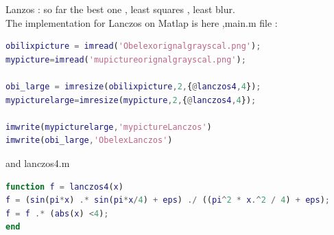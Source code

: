 \documentclass{article}
\begin{document}
Lanzos : so far the best one , least squares , least blur.\\
The implementation for Lanczos on Matlap is here ,main.m file :
\begin{lstlisting}[language = matlab]
obilixpicture = imread('Obelexorignalgrayscal.png');
mypicture=imread('mupictureorignalgrayscal.png');

obi_large = imresize(obilixpicture,2,{@lanczos4,4});
mypicturelarge=imresize(mypicture,2,{@lanczos4,4});

imwrite(mypicturelarge,'mypictureLanczos')
imwrite(obi_large,'ObelexLanczos')
\end{lstlisting}
and lanczos4.m
\begin{lstlisting}[language = matlab]
function f = lanczos4(x)
f = (sin(pi*x) .* sin(pi*x/4) + eps) ./ ((pi^2 * x.^2 / 4) + eps);
f = f .* (abs(x) <4);
end
\end{lstlisting}
\end{document}

